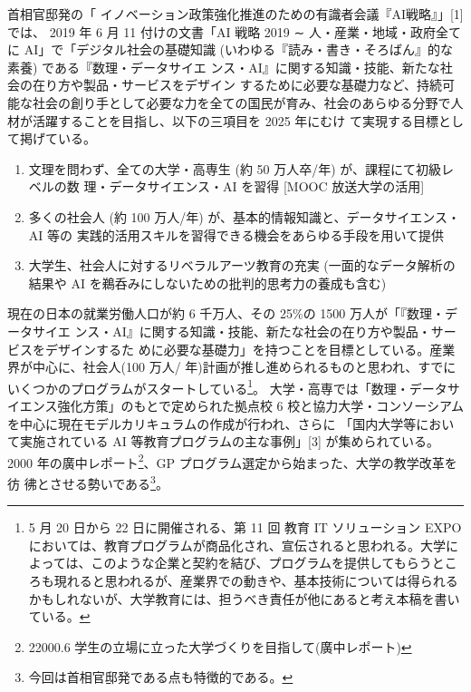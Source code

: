 \documentclass[
]{bxjsbook}
\theoremstyle{definition}
\theoremstyle{definition}
\theoremstyle{definition}
\theoremstyle{definition}
\theoremstyle{remark}
\begin{document}
首相官邸発の「 イノベーション政策強化推進のための有識者会議『AI戦略』」{[}1{]} では、 2019 年 6 月 11 付けの文書「AI 戦略 2019 ∼ 人・産業・地域・政府全てに AI」で「デジタル社会の基礎知識 (いわゆる『読み・書き・そろばん』的な素養) である『数理・データサイエ ンス・AI』に関する知識・技能、新たな社会の在り方や製品・サービスをデザイン するために必要な基礎力など、持続可能な社会の創り手として必要な力を全ての国民が育み、社会のあらゆる分野で人材が活躍することを目指し、以下の三項目を 2025 年にむけ て実現する目標として掲げている。

\begin{enumerate}
\def\labelenumi{\arabic{enumi}.}
\item
  文理を問わず、全ての大学・高専生 (約 50 万人卒/年) が、課程にて初級レベルの数 理・データサイエンス・AI を習得 {[}MOOC 放送大学の活用{]}
\item
  多くの社会人 (約 100 万人/年) が、基本的情報知識と、データサイエンス・AI 等の 実践的活用スキルを習得できる機会をあらゆる手段を用いて提供
\item
  大学生、社会人に対するリベラルアーツ教育の充実 (一面的なデータ解析の結果や AI を鵜呑みにしないための批判的思考力の養成も含む)
\end{enumerate}

現在の日本の就業労働人口が約 6 千万人、その 25\%の 1500 万人が「『数理・データサイエ ンス・AI』に関する知識・技能、新たな社会の在り方や製品・サービスをデザインするた めに必要な基礎力」を持つことを目標としている。産業界が中心に、社会人(100 万人/ 年)計画が推し進められるものと思われ、すでにいくつかのプログラムがスタートしている\footnote{5 月 20 日から 22 日に開催される、第 11 回 教育 IT ソリューション EXPO においては、教育プログラムが商品化され、宣伝されると思われる。大学によっては、このような企業と契約を結び、プログラムを提供してもらうところも現れると思われるが、産業界での動きや、基本技術については得られるかもしれないが、大学教育には、担うべき責任が他にあると考え本稿を書いている。}。
大学・高専では「数理・データサイエンス強化方策」のもとで定められた拠点校 6 校と協力大学・コンソーシアムを中心に現在モデルカリキュラムの作成が行われ、さらに
「国内大学等において実施されている AI 等教育プログラムの主な事例」{[}3{]} が集められている。2000 年の廣中レポート\footnote{22000.6 学生の立場に立った大学づくりを目指して(廣中レポート)}、GP プログラム選定から始まった、大学の教学改革を彷 彿とさせる勢いである\footnote{今回は首相官邸発である点も特徴的である。}。
\end{document}
